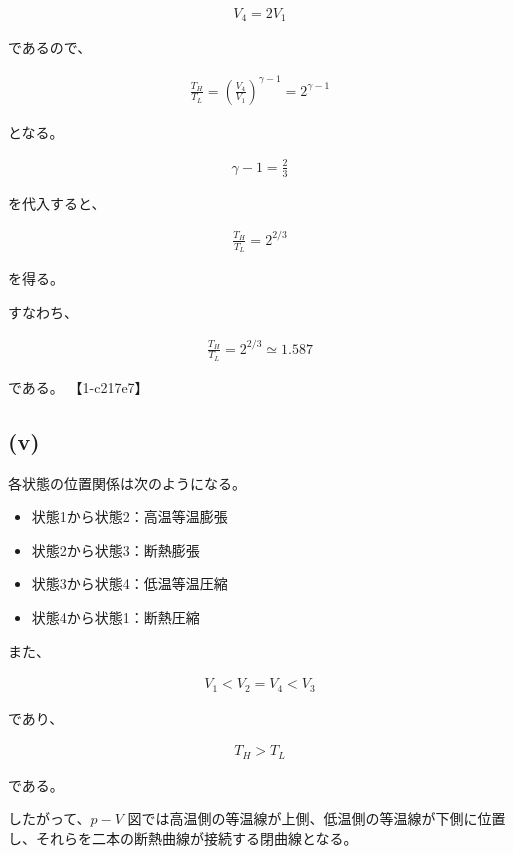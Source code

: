 \documentclass[platex,dvipdfmx,a4paper]{jsarticle}
\begin{document}
\begin{align*}
V_4=2V_1
\end{align*}

であるので、

\begin{align*}
\frac{T_H}{T_L}
=
\left(
\frac{V_4}{V_1}
\right)^{\gamma-1}
=
2^{\gamma-1}
\end{align*}

となる。

\begin{align*}
\gamma-1
=
\frac23
\end{align*}

を代入すると、

\begin{align*}
\frac{T_H}{T_L}
=
2^{2/3}
\end{align*}

を得る。

すなわち、

\begin{align*}
\frac{T_H}{T_L}
=
2^{2/3}
\simeq
1.587
\end{align*}

である。 【1-c217e7】

\subsection{(v)}

各状態の位置関係は次のようになる。

\begin{itemize}
\item 状態1から状態2：高温等温膨張
\item 状態2から状態3：断熱膨張
\item 状態3から状態4：低温等温圧縮
\item 状態4から状態1：断熱圧縮
\end{itemize}

また、

\begin{align*}
V_1
<
V_2=V_4
<
V_3
\end{align*}

であり、

\begin{align*}
T_H>T_L
\end{align*}

である。

したがって、$p-V$ 図では高温側の等温線が上側、低温側の等温線が下側に位置し、それらを二本の断熱曲線が接続する閉曲線となる。
\end{document}
